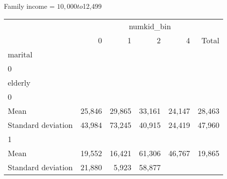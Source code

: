 Family income = $10,000 to $12,499
\begin{tabular}{llllll}
\cline{1-6}
\multicolumn{1}{c}{} &
  \multicolumn{5}{|c}{numkid\_bin} \\
\multicolumn{1}{c}{} &
  \multicolumn{1}{|r}{0} &
  \multicolumn{1}{r}{1} &
  \multicolumn{1}{r}{2} &
  \multicolumn{1}{r}{4} &
  \multicolumn{1}{r}{Total} \\
\cline{1-6}
\multicolumn{1}{l}{marital} &
  \multicolumn{1}{|r}{} &
  \multicolumn{1}{r}{} &
  \multicolumn{1}{r}{} &
  \multicolumn{1}{r}{} &
  \multicolumn{1}{r}{} \\
\multicolumn{1}{l}{\hspace{1em}0} &
  \multicolumn{1}{|r}{} &
  \multicolumn{1}{r}{} &
  \multicolumn{1}{r}{} &
  \multicolumn{1}{r}{} &
  \multicolumn{1}{r}{} \\
\multicolumn{1}{l}{\hspace{2em}elderly} &
  \multicolumn{1}{|r}{} &
  \multicolumn{1}{r}{} &
  \multicolumn{1}{r}{} &
  \multicolumn{1}{r}{} &
  \multicolumn{1}{r}{} \\
\multicolumn{1}{l}{\hspace{3em}0} &
  \multicolumn{1}{|r}{} &
  \multicolumn{1}{r}{} &
  \multicolumn{1}{r}{} &
  \multicolumn{1}{r}{} &
  \multicolumn{1}{r}{} \\
\multicolumn{1}{l}{\hspace{4em}Mean} &
  \multicolumn{1}{|r}{25,846} &
  \multicolumn{1}{r}{29,865} &
  \multicolumn{1}{r}{33,161} &
  \multicolumn{1}{r}{24,147} &
  \multicolumn{1}{r}{28,463} \\
\multicolumn{1}{l}{\hspace{4em}Standard deviation} &
  \multicolumn{1}{|r}{43,984} &
  \multicolumn{1}{r}{73,245} &
  \multicolumn{1}{r}{40,915} &
  \multicolumn{1}{r}{24,419} &
  \multicolumn{1}{r}{47,960} \\
\multicolumn{1}{l}{\hspace{3em}1} &
  \multicolumn{1}{|r}{} &
  \multicolumn{1}{r}{} &
  \multicolumn{1}{r}{} &
  \multicolumn{1}{r}{} &
  \multicolumn{1}{r}{} \\
\multicolumn{1}{l}{\hspace{4em}Mean} &
  \multicolumn{1}{|r}{19,552} &
  \multicolumn{1}{r}{16,421} &
  \multicolumn{1}{r}{61,306} &
  \multicolumn{1}{r}{46,767} &
  \multicolumn{1}{r}{19,865} \\
\multicolumn{1}{l}{\hspace{4em}Standard deviation} &
  \multicolumn{1}{|r}{21,880} &
  \multicolumn{1}{r}{5,923} &
  \multicolumn{1}{r}{58,877} &

\end{tabular}
